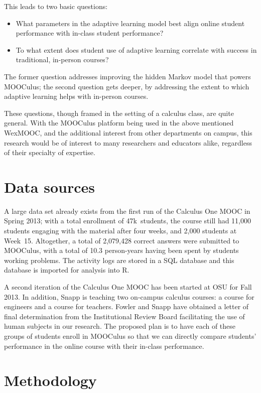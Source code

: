 \documentclass[12pt]{article}
\begin{document}
This leads to two basic questions:
\begin{itemize}
\item What parameters in the adaptive learning model best align online
  student performance with in-class student performance?
\item To what extent does student use of adaptive learning correlate
  with success in traditional, in-person courses?
\end{itemize}
The former question addresses improving the hidden Markov model that
powers MOOCulus; the second question gets deeper, by addressing the
extent to which adaptive learning helps with in-person courses.

These questions, though framed in the setting of a calculus class, are
quite general. With the MOOCulus platform being used in the above
mentioned WexMOOC, and the additional interest from other departments
on campus, this research would be of interest to many researchers and
educators alike, regardless of their specialty of expertise.

\section{Data sources}

A large data set already exists from the first run of the Calculus One
MOOC in Spring 2013; with a total enrollment of 47k~students, the
course still had 11,000 students engaging with the material after four
weeks, and 2,000 students at Week~15.  Altogether, a total of
2,079,428 correct answers were submitted to MOOCulus, with a total of
10.3 person-years having been spent by students working problems.  The
activity logs are stored in a SQL database and this database is
imported for analysis into R.

A second iteration of the Calculus One MOOC has been started at OSU
for Fall 2013.  In addition, Snapp is teaching two on-campus calculus
courses: a course for engineers and a course for teachers.  Fowler and
Snapp have obtained a letter of final determination from the
Institutional Review Board facilitating the use of human subjects in
our research.  The proposed plan is to have each of these groups of
students enroll in MOOCulus so that we can directly compare students'
performance in the online course with their in-class performance.


\section{Methodology}
\end{document}
